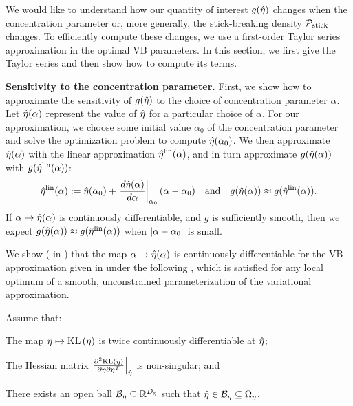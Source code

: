 We would like to understand how our quantity of interest $g(\hat\eta)$ changes
when the concentration parameter or, more generally, the stick-breaking density
$\mathcal{P}_{\mathrm{stick}}$ changes. To efficiently compute these changes, we use a first-order
Taylor series approximation in the optimal VB parameters. In this section, we
first give the Taylor series and then show how to compute its terms.

\noindent \textbf{Sensitivity to the concentration parameter.} First, we show
how to approximate the sensitivity of $g(\hat\eta)$ to the choice of
concentration parameter $\alpha$. Let $\hat\eta(\alpha)$ represent the value of
$\hat\eta$ for a particular choice of $\alpha$. For our approximation, we choose
some initial value $\alpha_0$ of the concentration parameter and solve the
optimization problem to compute $\hat\eta(\alpha_0)$. We then approximate
$\hat\eta(\alpha)$ with the linear approximation $\hat\eta^{\mathrm{lin}}(\alpha)$, and in turn
approximate $g(\hat\eta(\alpha))$ with $g(\hat\eta^{\mathrm{lin}}(\alpha))$:
%
\begin{align*}
%
\etalin(\alpha) :=
    \etaopt(\alpha_0) +
    \fracat{d\etaopt(\alpha)}{d\alpha}{\alpha_0} (\alpha - \alpha_0)
\mathand
g(\etaopt(\alpha)) \approx g(\etalin(\alpha)).
%
\end{align*}
%
If $\alpha \mapsto \hat\eta(\alpha)$ is continuously differentiable, and $g$ is
sufficiently smooth, then we expect $g(\hat\eta(\alpha)) \approx
g(\hat\eta^{\mathrm{lin}}(\alpha))$ when $\left|\alpha - \alpha_0\right|$ is small.

We show ( in ) that the map
$\alpha \mapsto \hat\eta(\alpha)$ is continuously differentiable for the VB
approximation given in  under the following
, which is satisfied for any local optimum of a smooth,
unconstrained parameterization of the variational approximation.

\begin{assu}
%
Assume that:
%
\begin{enumerate*}[label=(\arabic*)]
%
    \item {} The map $\eta \mapsto \mathrm{KL}\left(\eta\right)$ is twice
    continuously differentiable at $\hat\eta$;

    \item{} The Hessian matrix $\left.\frac{\partial^2 \mathrm{KL}\left(\eta\right)}{\partial \eta \partial \eta^T}\right\vert_{\hat\eta}$ is non-singular; and

    \item {} There exists an open ball $\mathcal{B}_\eta
    \subseteq \mathbb{R}^{D_{\eta}}$ such that $\hat\eta \in \mathcal{B}_\eta \subseteq
    \Omega_{\eta}$.
%
\end{enumerate*}
%
\end{assu}



